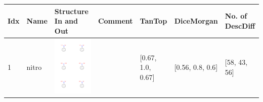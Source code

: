 \begin{longtable}{|l|l|l|l|l|l|l|}
\hline
Idx & Name & Structure In and Out & Comment & TanTop & DiceMorgan & No. of DescDiff\\
\hline
1 & nitro & \includegraphics[scale=0.6]{nitroMV.png} & & [0.67, 1.0, 0.67]& [0.56, 0.8, 0.6] & [58, 43, 56] \\
\hline
\end{longtable}